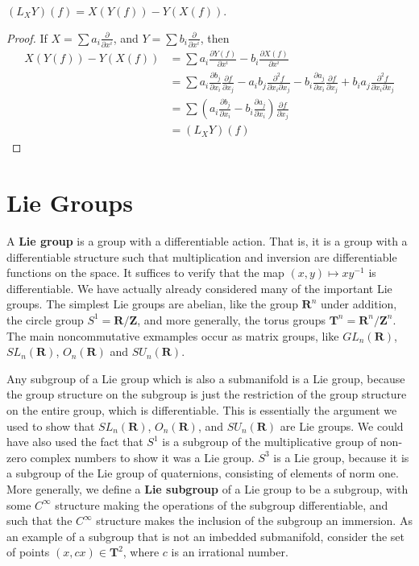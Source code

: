 \begin{theorem}
    $(L_X Y)(f) = X(Y(f)) - Y(X(f))$.
\end{theorem}
\begin{proof}
    If $X = \sum a_i \frac{\partial}{\partial x^i}$, and $Y = \sum b_i \frac{\partial}{\partial x^i}$, then
    \begin{align*} X(Y(f)) - Y(X(f)) &= \sum a_i \frac{\partial Y(f)}{\partial x^i} - b_i \frac{\partial X(f)}{\partial x^i}\\
    &= \sum a_i \frac{\partial b_j}{\partial x_i} \frac{\partial f}{\partial x_j} - a_i b_j \frac{\partial^2 f}{\partial x_i \partial x_j} - b_i \frac{\partial a_j}{\partial x_i} \frac{\partial f}{\partial x_j} + b_i a_j \frac{\partial^2 f}{\partial x_i \partial x_j}\\
    &= \sum \left( a_i \frac{\partial b_j}{\partial x_i} - b_i \frac{\partial a_j}{\partial x_i} \right) \frac{\partial f}{\partial x_j}\\
    &= (L_X Y)(f)
    \end{align*}
\end{proof}







\chapter{Lie Groups}

A {\bf Lie group} is a group with a differentiable action. That is, it is a group with a differentiable structure such that multiplication and inversion are differentiable functions on the space. It suffices to verify that the map $(x,y) \mapsto xy^{-1}$ is differentiable. We have actually already considered many of the important Lie groups. The simplest Lie groups are abelian, like the group $\mathbf{R}^n$ under addition, the circle group $S^1 = \mathbf{R}/\mathbf{Z}$, and more generally, the torus groups $\mathbf{T}^n = \mathbf{R}^n/\mathbf{Z}^n$. The main noncommutative exmamples occur as matrix groups, like $GL_n(\mathbf{R})$, $SL_n(\mathbf{R})$, $O_n(\mathbf{R})$ and $SU_n(\mathbf{R})$.

Any subgroup of a Lie group which is also a submanifold is a Lie group, because the group structure on the subgroup is just the restriction of the group structure on the entire group, which is differentiable. This is essentially the argument we used to show that $SL_n(\mathbf{R})$, $O_n(\mathbf{R})$, and $SU_n(\mathbf{R})$ are Lie groups. We could have also used the fact that $S^1$ is a subgroup of the multiplicative group of non-zero complex numbers to show it was a Lie group. $S^3$ is a Lie group, because it is a subgroup of the Lie group of quaternions, consisting of elements of norm one. More generally, we define a {\bf Lie subgroup} of a Lie group to be a subgroup, with some $C^\infty$ structure making the operations of the subgroup differentiable, and such that the $C^\infty$ structure makes the inclusion of the subgroup an immersion. As an example of a subgroup that is not an imbedded submanifold, consider the set of points $(x,cx) \in \mathbf{T}^2$, where $c$ is an irrational number.

